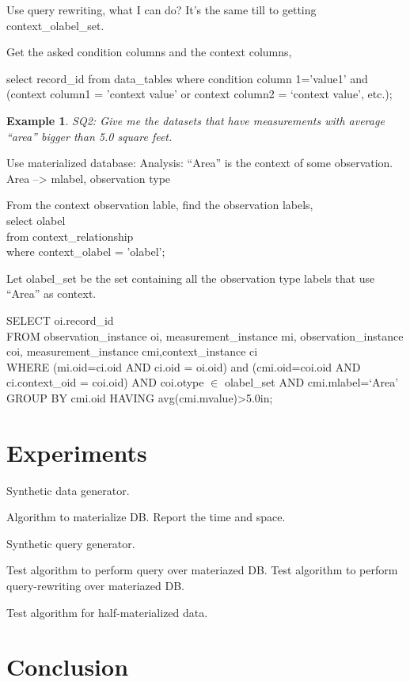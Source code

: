 \documentclass[conference]{IEEEtran}
\newtheorem{example}{Example}[section]
\begin{document}
Use query rewriting, what I can do? 
It's the same till to getting context\_olabel\_set. 

Get the asked condition columns and the context columns, 

select record\_id from data\_tables
where condition column 1='value1' and (context column1 = 'context
value' or context column2 = `context value', etc.);

\begin{example}
SQ2: Give me the datasets that have measurements with average ``area''
bigger than 5.0 square feet. 
\end{example}

Use materialized database: 
Analysis: ``Area'' is the context of some observation.
Area --> mlabel, observation type

From the context observation lable, find the observation labels, \\
select olabel\\
from context\_relationship\\
where context\_olabel = 'olabel'; 

Let olabel\_set  be the set containing all the observation type
labels that use ``Area'' as context. 

SELECT oi.record\_id \\
FROM observation\_instance oi, measurement\_instance mi, 
observation\_instance coi, measurement\_instance cmi,context\_instance ci\\
WHERE (mi.oid=ci.oid AND ci.oid = oi.oid) and (cmi.oid=coi.oid AND ci.context\_oid =
coi.oid) AND coi.otype $\in$ olabel\_set 
AND cmi.mlabel=`Area'
GROUP BY cmi.oid
HAVING avg(cmi.mvalue)>5.0in;


\section{Experiments}

Synthetic data generator. 

Algorithm to materialize DB. 
Report the time and space. 

Synthetic query generator. 

Test algorithm to perform query over materiazed DB.
Test algorithm to perform query-rewriting over materiazed DB.

Test algorithm for half-materialized data.

\section{Conclusion}


%
%
%
%


%
%
\end{document}
